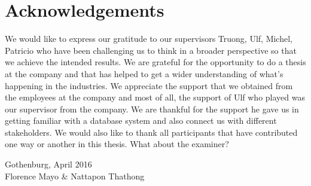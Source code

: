 \thispagestyle{plain}			%

\section*{Acknowledgements}
We would like to express our gratitude to our supervisors Truong, Ulf, Michel, Patricio who have been challenging us to think in a broader perspective so that we achieve the intended results. We are grateful for the opportunity to do a thesis at the company and that has helped to get a wider understanding of what’s happening in the industries. We appreciate the support that we obtained from the employees at the company and most of all, the support of Ulf who played was our supervisor from the company. We are thankful for the support he gave us in getting familiar with a database system and also connect us with different stakeholders.
We would also like to thank all participants that have contributed one way or another in this thesis.
What about the examiner? \todo{[to be filled in]}

\vspace{1.5cm}
\hfill
\begin{flushright}Gothenburg, April 2016\\
Florence Mayo \& Nattapon Thathong
\end{flushright}

\thispagestyle{empty}
\mbox{}